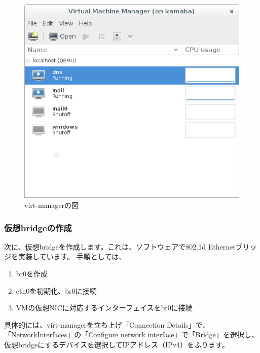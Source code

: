 \documentclass[mingoth,a4paper]{jsarticle}
\begin{document}
\begin{figure}[!h]
\centering
\includegraphics{image201404/virt-manager.png}
\caption{virt-managerの図}
\end{figure}

\subsubsection{仮想bridgeの作成}
次に、仮想bridgeを作成します。これは、ソフトウェアで802.1d Ethernetブリッジを実装しています。
手順としては、
\begin{enumerate}
\item br0を作成
\item eth0を初期化、br0に接続
\item VMの仮想NICに対応するインターフェイスをbr0に接続
\end{enumerate}

具体的には、virt-managerを立ち上げ「Connection Details」で、「NetworkInterfaces」の「Configure network interface」で「Bridge」を選択し、仮想bridgeにするデバイスを選択してIPアドレス（IPv4）をふります。
\end{document}
